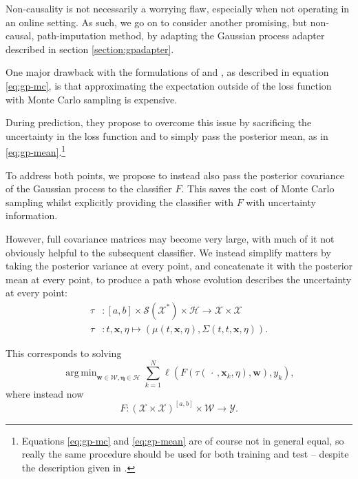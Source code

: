 \documentclass{article}
\DeclareMathOperator*{\argmin}{arg\,min}
\newcommand{\dataspace}{\mathcal{X}}
\newcommand{\lspace}{\mathcal{Y}}
\newcommand{\seriesspace}{\mathcal{S}}
\begin{document}
Non-causality is not necessarily a worrying flaw, especially when not operating in an online setting. As such, we go on to consider another promising, but non-causal, path-imputation method, by adapting the Gaussian process adapter described in section \ref{section:gpadapter}.

One major drawback with the formulations of \cite{li2016scalable} and \cite{futoma2017mgp}, as described in equation \eqref{eq:gp-mc}, is that approximating the expectation outside of the loss function with Monte Carlo sampling is expensive.

During prediction, they propose to overcome this issue by sacrificing the uncertainty in the loss function and to simply pass the posterior mean, as in \eqref{eq:gp-mean}.\footnote{Equations \eqref{eq:gp-mc} and \eqref{eq:gp-mean} are of course not in general equal, so really the same procedure should be used for both training and test -- despite the description given in \cite[Section 3.1]{li2016scalable}.}

To address both points, we propose to instead also pass the posterior covariance of the Gaussian process to the classifier $F$. This saves the cost of Monte Carlo sampling whilst explicitly providing the classifier with $F$ with uncertainty information.

However, full covariance matrices may become very large, with much of it not obviously helpful to the subsequent classifier. We instead simplify matters by taking the posterior variance at every point, and concatenate it with the posterior mean at every point, to produce a path whose evolution describes the uncertainty at every point:
\begin{align*}
    \tau &\colon [a, b] \times \seriesspace(\dataspace^*) \times \mathcal{H} \to \dataspace \times \dataspace\\
    \tau &\colon t, \mathbf{x}, \eta \mapsto (\mu(t, \mathbf{x}, \eta), \Sigma(t, t, \mathbf{x}, \eta)).
\end{align*}

This corresponds to solving
\begin{equation}\label{eq:gp-moments}
\argmin_{\mathbf{w} \in \mathcal{W},\bm{\eta} \in \mathcal{H}} \sum_{k=1}^N \ell(F(\tau(\,\cdot\,,\mathbf{x}_k, \eta), \mathbf{w}), y_k),
\end{equation}
where instead now
\begin{equation*}
    F \colon (\dataspace \times \dataspace)^{[a, b]} \times \mathcal{W} \to \lspace.
\end{equation*}
\end{document}

